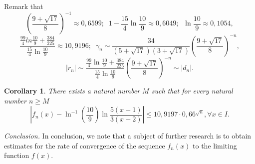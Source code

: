 \documentclass[11pt]{amsart}
\theoremstyle{plain}
\newtheorem{corollary}[theorem]{Corollary}
\theoremstyle{remark}
\begin{document}
Remark that
$$\left(\frac{9+\sqrt{17}}{8}\right)^{-1} \approx 0,6599; \;\;  1-\frac{15}{4}\ln \frac{10}{9} \approx 0,6049; \;\; \ln \frac{10}{9}  \approx 0,1054,  $$
$$\frac{\frac{99}{4}ln\frac{10}{9}+ \frac{384}{225}}{ \frac{15}{4}\ln\frac{10}{9}}  \approx 10,9196;  \;\; \gamma_{n}\sim      \frac{34}{(5+\sqrt{17})(3+\sqrt{17})}     \left(\frac{9+\sqrt{17}}{8}\right)^{-n},    $$
$$
|r_n|\sim      \frac{\frac{99}{4}\ln\frac{10}{9}+ \frac{384}{225}}{ \frac{15}{4}\ln \frac{10}{9}}      \left(\frac{9+\sqrt{17}}{8}\right)^{-n}\sim
|d_n|.
$$
\begin{corollary}
There exists a natural number $M$ such that for every natural number $n\geq M$
$$
 \left|f_{n}(x)-\ln^{-1}\left(\frac{10}{9}\right)\ln\frac{5(x+1)}{3(x+2)}\right|\leq 10,9197 \cdot 0,66^{\sqrt{n}}, \forall x \in I.
$$
\end{corollary}

\textit{Conclusion.} In conclusion, we note that a subject of further research is to obtain estimates for the rate of convergence of the sequence $f_n(x)$ to the limiting function $f(x)$.
\end{document}
